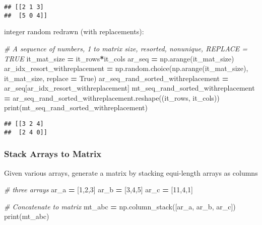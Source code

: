 \documentclass[
]{book}
\newenvironment{Shaded}{\begin{snugshade}}{\end{snugshade}}
\newcommand{\BuiltInTok}[1]{#1}
\newcommand{\CommentTok}[1]{\textcolor[rgb]{0.56,0.35,0.01}{\textit{#1}}}
\newcommand{\DecValTok}[1]{\textcolor[rgb]{0.00,0.00,0.81}{#1}}
\newcommand{\NormalTok}[1]{#1}
\newcommand{\OperatorTok}[1]{\textcolor[rgb]{0.81,0.36,0.00}{\textbf{#1}}}
\newcommand{\VariableTok}[1]{\textcolor[rgb]{0.00,0.00,0.00}{#1}}
\begin{document}
\begin{verbatim}
## [[2 1 3]
##  [5 0 4]]
\end{verbatim}

integer random redrawn (with replacements):

\begin{Shaded}
\begin{Highlighting}[]
\CommentTok{# A sequence of numbers, 1 to matrix size, resorted, nonunique, REPLACE = TRUE}
\NormalTok{it_mat_size }\OperatorTok{=}\NormalTok{ it_rows}\OperatorTok{*}\NormalTok{it_cols}
\NormalTok{ar_seq }\OperatorTok{=}\NormalTok{ np.arange(it_mat_size)}
\NormalTok{ar_idx_resort_withreplacement }\OperatorTok{=}\NormalTok{ np.random.choice(np.arange(it_mat_size), it_mat_size, replace }\OperatorTok{=} \VariableTok{True}\NormalTok{)}
\NormalTok{ar_seq_rand_sorted_withreplacement }\OperatorTok{=}\NormalTok{ ar_seq[ar_idx_resort_withreplacement]}
\NormalTok{mt_seq_rand_sorted_withreplacement }\OperatorTok{=}\NormalTok{ ar_seq_rand_sorted_withreplacement.reshape((it_rows, it_cols))}
\BuiltInTok{print}\NormalTok{(mt_seq_rand_sorted_withreplacement)}
\end{Highlighting}
\end{Shaded}

\begin{verbatim}
## [[3 2 4]
##  [2 4 0]]
\end{verbatim}

\hypertarget{stack-arrays-to-matrix}{%
\subsubsection{Stack Arrays to Matrix}\label{stack-arrays-to-matrix}}

Given various arrays, generate a matrix by stacking equi-length arrays as columns

\begin{Shaded}
\begin{Highlighting}[]
\CommentTok{# three arrays}
\NormalTok{ar_a }\OperatorTok{=}\NormalTok{ [}\DecValTok{1}\NormalTok{,}\DecValTok{2}\NormalTok{,}\DecValTok{3}\NormalTok{]}
\NormalTok{ar_b }\OperatorTok{=}\NormalTok{ [}\DecValTok{3}\NormalTok{,}\DecValTok{4}\NormalTok{,}\DecValTok{5}\NormalTok{]}
\NormalTok{ar_c }\OperatorTok{=}\NormalTok{ [}\DecValTok{11}\NormalTok{,}\DecValTok{4}\NormalTok{,}\DecValTok{1}\NormalTok{]}

\CommentTok{# Concatenate to matrix}
\NormalTok{mt_abc }\OperatorTok{=}\NormalTok{ np.column_stack([ar_a, ar_b, ar_c])}
\BuiltInTok{print}\NormalTok{(mt_abc)}
\end{Highlighting}
\end{Shaded}
\end{document}
